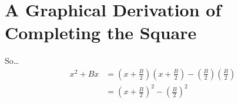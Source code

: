 \section{A Graphical Derivation of Completing the Square}
\newcommand{\myEdgeDim}{2in}
\begin{tcbraster}[
    raster columns = 3,
    raster equal height=all,
    height = 2in,
    colback=white,
]
    \begin{tcolorbox}[height = \myEdgeDim, width=\myEdgeDim,]
    \end{tcolorbox}
    \begin{tcolorbox}[height = \myEdgeDim, width=\myEdgeDim,]
    \end{tcolorbox}
    \begin{tcolorbox}[height = \myEdgeDim, width=\myEdgeDim,]
    \end{tcolorbox}
    \begin{tcolorbox}[height = \myEdgeDim, width=\myEdgeDim,]
    \end{tcolorbox}
    \begin{tcolorbox}[height = \myEdgeDim, width=\myEdgeDim,]
    \end{tcolorbox}
    \begin{tcolorbox}[height = \myEdgeDim, width=\myEdgeDim,]
    \end{tcolorbox}
    \begin{tcolorbox}[height = \myEdgeDim, width=\myEdgeDim,]
    \end{tcolorbox}
    \begin{tcolorbox}[height = \myEdgeDim, width=\myEdgeDim,]
    \end{tcolorbox}
    \begin{tcolorbox}[height = \myEdgeDim, width=\myEdgeDim,]
    \end{tcolorbox}
\end{tcbraster}

So\dots
\begin{align*} 
    x^2 + B x 
    &= 
    \left(x+ \frac{B}{2}\right) 
    \left(x+ \frac{B}{2}\right) 
    - 
    \left( \frac{B}{2} \right)
    \left( \frac{B}{2} \right) \\
    &= 
    \left(x+ \frac{B}{2}\right)^2 
    - 
    \left( \frac{B}{2} \right)^2
\end{align*}
